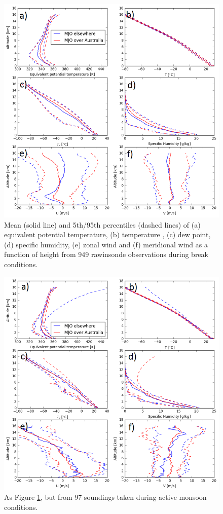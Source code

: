\documentclass[journal abbreviation, manuscript]{copernicus}
\begin{document}
\begin{figure}[t]
\includegraphics[width=18cm]{thermodynamic_profiles_with_spreads_break.png}
\caption{Mean (solid line) and 5th/95th percentiles (dashed lines) of (a) equivalent potential temperature, (b) temperature , (c) dew point, (d) specific humidity, (e) zonal wind and (f) meridional wind as a function of height from 949 rawinsonde observations during break conditions.}
\label{fig:soundings_break}
\end{figure}
\clearpage

\begin{figure}[t]
\includegraphics[width=18cm]{thermodynamic_profiles_with_spreads_monsoon.png}
\caption{As Figure \ref{fig:soundings_break}, but from 97 soundings taken during active monsoon conditions.}
\label{fig:soundings_monsoon}
\end{figure}
\clearpage
\end{document}
